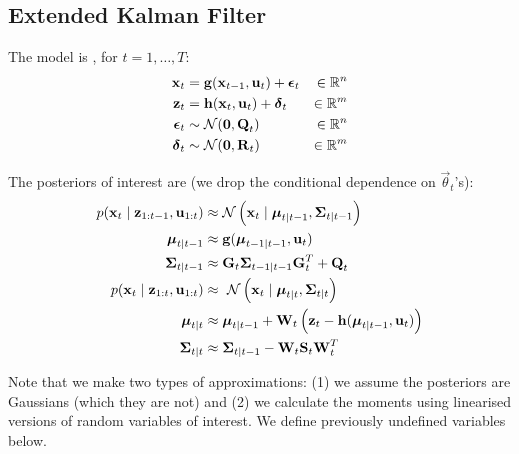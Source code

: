 \subsection{Extended Kalman Filter}
The model is , for $t = 1, \dotsc, T$:
\begin{align}
	\boldsymbol{\mathbf{x}}_t	&= \boldsymbol{\mathbf{g}}(\boldsymbol{\mathbf{x}}_{t - 1}, \boldsymbol{\mathbf{u}}_t) + \boldsymbol{\mathbf{\epsilon}}_t 	&\in \mathbb R^n\\
	\boldsymbol{\mathbf{z}}_t	&= \boldsymbol{\mathbf{h}}(\boldsymbol{\mathbf{x}}_t, \boldsymbol{\mathbf{u}}_t) + \boldsymbol{\mathbf{\delta}}_t 			&\in \mathbb R^m\\
	\boldsymbol{\mathbf{\epsilon}}_t	&\sim \operatorname{\mathcal N}(\boldsymbol{\mathbf{0}}, \boldsymbol{\mathbf{Q}}_t) 						&\in \mathbb R^n\\
	\boldsymbol{\mathbf{\delta}}_t	&\sim \operatorname{\mathcal N}(\boldsymbol{\mathbf{0}}, \boldsymbol{\mathbf{R}}_t) 						&\in \mathbb R^m
\end{align}

The posteriors of interest are (we drop the conditional dependence on $\vec \theta_t$'s):
\begin{align}
	p(\vec x_t \mid \vec z_{1:t - 1}, \vec u_{1:t})	&\approx \Gauss\left(\vec x_t \mid \vec \mu_{t \mid t - 1}, \vec\Sigma_{t \mid t - 1}\right) \\
	\vec \mu_{t \mid t - 1}							&\approx \vec g(\vec \mu_{t - 1 \mid t - 1}, \vec u_t) \\
	\vec \Sigma_{t \mid t - 1}						&\approx \vec G_t \vec \Sigma_{t - 1 \mid t - 1} \vec G_t^T + \vec Q_t \\
	p(\vec x_t \mid \vec z_{1:t}, \vec u_{1:t}) 	&\approx\ \Gauss\left(\vec x_t \mid \vec \mu_{t \mid t}, \vec\Sigma_{t \mid t}\right) \\
	\vec \mu_{t \mid t}								&\approx \vec \mu_{t \mid t - 1} + \vec W_t \left(\vec z_t - \vec h(\vec \mu_{t \mid t - 1}, \vec u_t)\right) \\
	\vec \Sigma_{t \mid t}							&\approx \vec \Sigma_{t \mid t - 1} - \vec W_t \vec S_t \vec W_t^T
\end{align}

Note that we make two types of approximations: (1) we assume the posteriors are Gaussians (which they are not) and (2) we calculate the moments using linearised versions of random variables of interest. We define previously undefined variables below.

